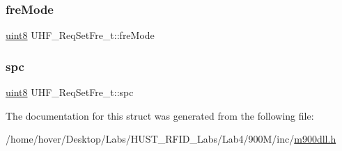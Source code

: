 \mbox{\label{struct_u_h_f___req_set_fre__t_ae69deb485d1de033ea262dea9d098f17}} 
\subsubsection{\texorpdfstring{freMode}{freMode}}
{\footnotesize\ttfamily \mbox{\hyperlink{m900dll_8h_adde6aaee8457bee49c2a92621fe22b79}{uint8}} U\+H\+F\+\_\+\+Req\+Set\+Fre\+\_\+t\+::fre\+Mode}

\mbox{\label{struct_u_h_f___req_set_fre__t_a77b638699a7c4deb45d6eff48dddefe5}} 
\subsubsection{\texorpdfstring{spc}{spc}}
{\footnotesize\ttfamily \mbox{\hyperlink{m900dll_8h_adde6aaee8457bee49c2a92621fe22b79}{uint8}} U\+H\+F\+\_\+\+Req\+Set\+Fre\+\_\+t\+::spc}



The documentation for this struct was generated from the following file\+:\begin{DoxyCompactItemize}
\item 
/home/hover/\+Desktop/\+Labs/\+H\+U\+S\+T\+\_\+\+R\+F\+I\+D\+\_\+\+Labs/\+Lab4/900\+M/inc/\mbox{\hyperlink{m900dll_8h}{m900dll.\+h}}\end{DoxyCompactItemize}
